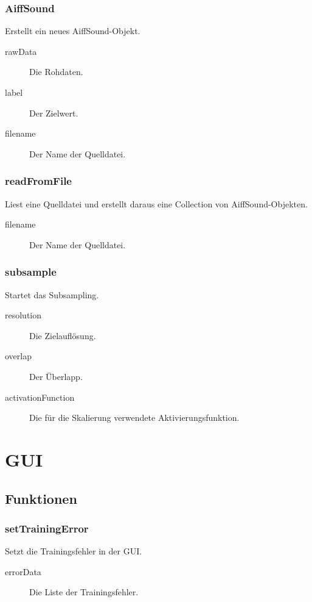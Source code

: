 \documentclass[a4paper,10pt]{scrartcl}
\begin{document}
\subsubsection{AiffSound}
Erstellt ein neues AiffSound-Objekt.
\begin{description}
\item[rawData] Die Rohdaten.
\item[label] Der Zielwert.
\item[filename] Der Name der Quelldatei.
\end{description}

\subsubsection{readFromFile}
Liest eine Quelldatei und erstellt daraus eine Collection von AiffSound-Objekten.
\begin{description}
\item[filename] Der Name der Quelldatei.
\end{description}

\subsubsection{subsample}
Startet das Subsampling.
\begin{description}
\item[resolution] Die Zielauflösung.
\item[overlap] Der Überlapp.
\item[activationFunction] Die für die Skalierung verwendete Aktivierungsfunktion.
\end{description}


\section{GUI}

\subsection{Funktionen}

\subsubsection{setTrainingError}
Setzt die Trainingsfehler in der GUI.
\begin{description}
\item[errorData] Die Liste der Trainingsfehler.
\end{description}
\end{document}
